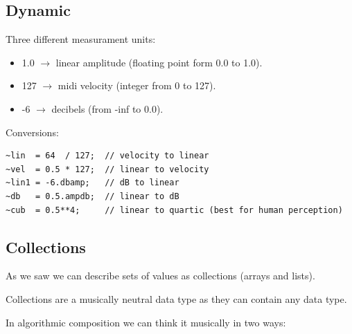 \subsection{Dynamic}\label{dynamic}

Three different measurament units:

\begin{itemize}
\tightlist
\item 1.0 \(\rightarrow\) linear amplitude (floating point form 0.0 to 1.0).
\item 127 \(\rightarrow\) midi velocity (integer from 0 to 127).
\item -6 \(\rightarrow\) decibels (from -inf to 0.0).
\end{itemize}

Conversions:

\begin{lstlisting}[frame=single] 
~lin  = 64  / 127;  // velocity to linear
~vel  = 0.5 * 127;  // linear to velocity
~lin1 = -6.dbamp;   // dB to linear
~db   = 0.5.ampdb;  // linear to dB
~cub  = 0.5**4;     // linear to quartic (best for human perception)             
\end{lstlisting}

\subsection{Collections}\label{collections}

As we saw we can describe sets of values \hspace{0pt}\hspace{0pt}as
collections (arrays and lists).

Collections are a musically neutral data type as they can contain any
data type.

In algorithmic composition we can think it musically in two ways:

